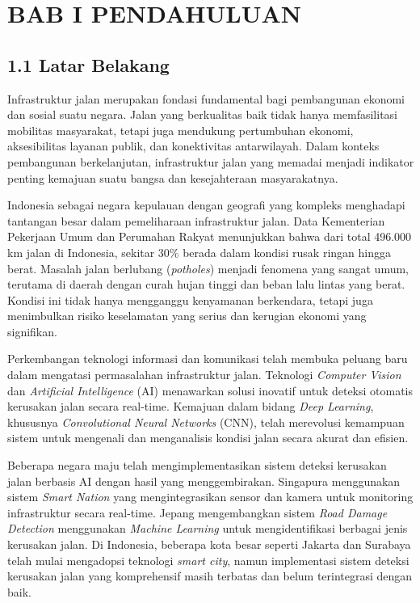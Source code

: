 \documentclass[12pt,a4paper]{article}
\begin{document}

\clearpage
\raggedright %

\onehalfspacing

\section*{BAB I PENDAHULUAN}

\subsection*{1.1 Latar Belakang}
Infrastruktur jalan merupakan fondasi fundamental bagi pembangunan ekonomi dan sosial suatu negara. Jalan yang berkualitas baik tidak hanya memfasilitasi mobilitas masyarakat, tetapi juga mendukung pertumbuhan ekonomi, aksesibilitas layanan publik, dan konektivitas antarwilayah. Dalam konteks pembangunan berkelanjutan, infrastruktur jalan yang memadai menjadi indikator penting kemajuan suatu bangsa dan kesejahteraan masyarakatnya.

Indonesia sebagai negara kepulauan dengan geografi yang kompleks menghadapi tantangan besar dalam pemeliharaan infrastruktur jalan. Data Kementerian Pekerjaan Umum dan Perumahan Rakyat menunjukkan bahwa dari total 496.000 km jalan di Indonesia, sekitar 30\% berada dalam kondisi rusak ringan hingga berat. Masalah jalan berlubang (\textit{potholes}) menjadi fenomena yang sangat umum, terutama di daerah dengan curah hujan tinggi dan beban lalu lintas yang berat. Kondisi ini tidak hanya mengganggu kenyamanan berkendara, tetapi juga menimbulkan risiko keselamatan yang serius dan kerugian ekonomi yang signifikan.

Perkembangan teknologi informasi dan komunikasi telah membuka peluang baru dalam mengatasi permasalahan infrastruktur jalan. Teknologi \textit{Computer Vision} dan \textit{Artificial Intelligence} (AI) menawarkan solusi inovatif untuk deteksi otomatis kerusakan jalan secara real-time. Kemajuan dalam bidang \textit{Deep Learning}, khususnya \textit{Convolutional Neural Networks} (CNN), telah merevolusi kemampuan sistem untuk mengenali dan menganalisis kondisi jalan secara akurat dan efisien.

Beberapa negara maju telah mengimplementasikan sistem deteksi kerusakan jalan berbasis AI dengan hasil yang menggembirakan. Singapura menggunakan sistem \textit{Smart Nation} yang mengintegrasikan sensor dan kamera untuk monitoring infrastruktur secara real-time. Jepang mengembangkan sistem \textit{Road Damage Detection} menggunakan \textit{Machine Learning} untuk mengidentifikasi berbagai jenis kerusakan jalan. Di Indonesia, beberapa kota besar seperti Jakarta dan Surabaya telah mulai mengadopsi teknologi \textit{smart city}, namun implementasi sistem deteksi kerusakan jalan yang komprehensif masih terbatas dan belum terintegrasi dengan baik.
\end{document}
